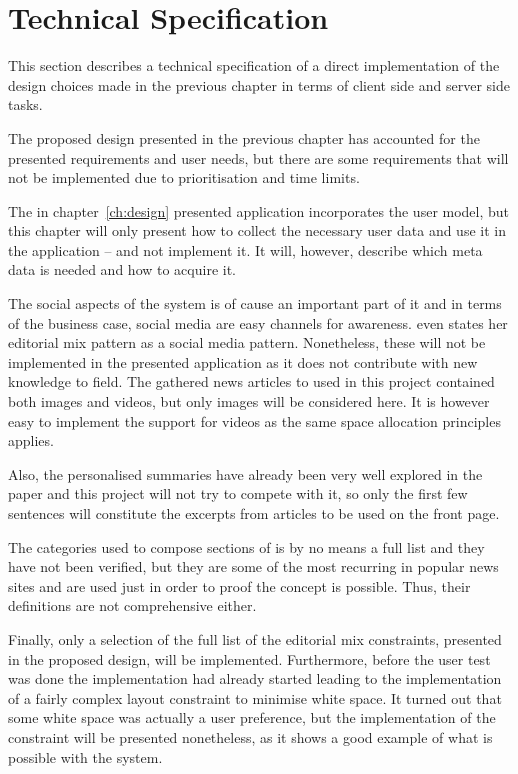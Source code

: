\chapter{Technical Specification} %
\label{ch:implementation}
This section describes a technical specification of a direct implementation of the design choices made in the previous chapter in terms of client side and server side tasks.

The proposed design presented in the previous chapter has accounted for the presented requirements and user needs, but there are some requirements that will not be implemented due to prioritisation and time limits.

The in chapter~\ref{ch:design} presented application incorporates the user model, but this chapter will only present how to collect the necessary user data and use it in the application -- and not implement it. It will, however, describe which meta data is needed and how to acquire it.

The social aspects of the system is of cause an important part of it and in terms of the business case, social media are easy channels for awareness. \cite{Tidwell} even states her editorial mix pattern as a social media pattern. Nonetheless, these will not be implemented in the presented application as it does not contribute with new knowledge to field. The gathered news articles to used in this project contained both images and videos, but only images will be considered here. It is however easy to implement the support for videos as the same space allocation principles applies.

Also, the personalised summaries have already been very well explored in the paper \cite{fulltext.pdf} and this project will not try to compete with it, so only the first few sentences will constitute the excerpts from articles to be used on the front page.

The categories used to compose sections of is by no means a full list and they have not been verified, but they are some of the most recurring in popular news sites and are used just in order to proof the concept is possible. Thus, their definitions are not comprehensive either.

Finally, only a selection of the full list of the editorial mix constraints, presented in the proposed design, will be implemented. Furthermore, before the user test was done the implementation had already started leading to the implementation of a fairly complex layout constraint to minimise white space. It turned out that some white space was actually a user preference, but the implementation of the constraint will be presented nonetheless, as it shows a good example of what is possible with the system. 
%


